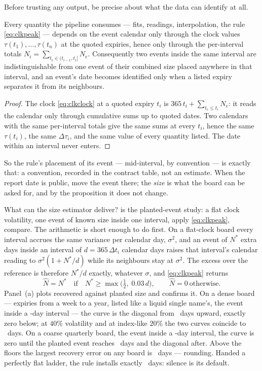 Before trusting any output, be precise about what the data can
identify at all.

\begin{proposition}
\label{prop:clkident}
Every quantity the pipeline consumes --- fits, readings,
interpolation, the rule \eqref{eq:clkpeak} --- depends on the
event calendar only through the clock values $\tau(t_1),\dots,
\tau(t_n)$ at the quoted expiries, hence only through the per-interval
totals $N_i=\sum_{t_e\in(t_{i-1},t_i]}N_e$.  Consequently two events
inside the same interval are indistinguishable from one event of
their combined size placed anywhere in that interval, and an event's
date becomes identified only when a listed expiry separates it from
its neighbours.
\end{proposition}

\begin{proof}
The clock \eqref{eq:clkclock} at a quoted expiry $t_i$ is
$365\,t_i+\sum_{t_e\le t_i}N_e$: it reads the calendar only through
cumulative sums up to quoted dates.  Two calendars with the same
per-interval totals give the same sums at every $t_i$, hence the same
$\tau(t_i)$, the same $\Delta\tau_i$, and the same value of every
quantity listed.  The date within an interval never enters.
\end{proof}

So the rule's placement of its event --- mid-interval, by
convention --- is exactly that: a convention, recorded in the
contract table, not an estimate.  When the report date is public,
move the event there; the \emph{size} is what the board can be asked
for, and by the proposition it does not change.

What can the size estimator deliver?   is the
planted-event study: a flat clock volatility, one event of known
size inside one interval, apply \eqref{eq:clkpeak}, compare.  The
arithmetic is short enough to do first.  On a flat-clock board every
interval accrues the same variance per calendar day, $\sigma^2$, and
an event of $N^\ast$ extra days inside an interval of
$d=365\,\Delta t_i$ calendar days raises that interval's calendar
reading to $\sigma^2(1+N^\ast/d)$ while its neighbours stay at
$\sigma^2$.  The excess over the reference is therefore
$N^\ast/d$ exactly, whatever $\sigma$, and \eqref{eq:clkpeak} returns
\[
\widehat N=N^\ast
\quad\text{if}\quad N^\ast\ge\max\!\big(\tfrac12,\;0.03\,d\big),
\qquad\widehat N=0\ \text{otherwise}.
\]
Panel~(a) plots recovered against planted size and confirms it.  On a
dense board --- expiries from a week to a year, listed like a liquid
single name's, the event inside a \MacClkIdentDenseWidthD-day
interval --- the curve is the diagonal from
\MacClkIdentFloorDenseD\ days upward, exactly zero below; at $40\%$
volatility and at index-like $20\%$ the two curves coincide to
\MacClkIdentVolDiffD\ days.  On a coarse quarterly board, the event
inside a \MacClkIdentQuartWidthD-day interval, the curve is zero until
the planted event reaches \MacClkIdentFloorQuartD\ days and the
diagonal after.  Above the floors the largest recovery error on any
board is \MacClkIdentMaxErrD\ days --- rounding.  Handed a perfectly
flat ladder, the rule installs exactly \MacClkIdentFlatDays\ days:
silence is its default.

